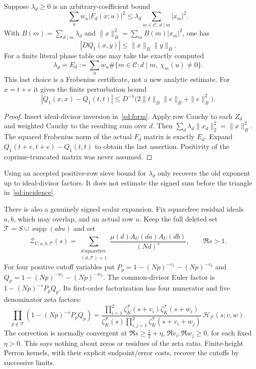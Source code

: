 \begin{proposition}\label{sd:lift}
Suppose $\lambda_d\ge0$ is an arbitrary-coefficient bound
\[
 \sum_u w_u|F_d(x;u)|^2\le\lambda_d
                 \sum_{m\in\mathcal C,\ d\mid m}|x_m|^2.
\]
With $B(m)=\sum_{d\mid m}\lambda_d$ and
$\|x\|_B^2=\sum_mB(m)|x_m|^2$, one has
\begin{equation}\label{sd:weighted}
 |DQ_1(x,y)|\le\|x\|_B\|y\|_B.
\end{equation}
For a finite literal phase table one may take the exactly computed
\[
 \lambda_d=E_d:=\sum_u w_u\#\{m\in\mathcal C:d\mid m,\ \chi_m(u)\ne0\}.
\]
This last choice is a Frobenius certificate, not a new analytic estimate.
For $x=t+e$ it gives the finite perturbation bound
\begin{equation}\label{sd:certificate}
 |Q_1(x,x)-Q_1(t,t)|\le
 D^{-1}\bigl(2\|t\|_B\|e\|_B+\|e\|_B^2\bigr).
\end{equation}
\end{proposition}
\begin{proof}
Insert ideal-divisor inversion in~\eqref{sd:form}. Apply row Cauchy to
each $Z_d$ and weighted Cauchy to the resulting sum over $d$.
Then $\sum_d\lambda_d\|x_d\|_2^2=\|x\|_B^2$.
The squared Frobenius norm of the actual $F_d$ matrix is exactly $E_d$.
Expand $Q_1(t+e,t+e)-Q_1(t,t)$ to obtain the last assertion.
Positivity of the coprime-truncated matrix was never assumed.
\end{proof}
Using an accepted positive-row sieve bound for $\lambda_d$ only recovers
the old exponent up to ideal-divisor factors. It does not estimate the
signed sum before the triangle in~\eqref{sd:incidence}.

There is also a genuinely signed scalar expansion. Fix squarefree residual
ideals $a,b$, which may overlap, and an actual row $u$.
Keep the full deleted set $\mathcal T=S\cup\operatorname{supp}(abu)$ and set
\[
 \mathcal Z_{U;a,b,\mathcal T}(s)=
 \sum_{\substack{d\ \mathrm{squarefree}\\(d,\mathcal T)=1}}
 \frac{\mu(d)A_U(da)A_U(db)}{(Nd)^s},\qquad\Re s>1.
\]
For four positive cutoff variables put
$P_p=1-(Np)^{-v_1}-(Np)^{-v_2}$ and
$Q_p=1-(Np)^{-w_1}-(Np)^{-w_2}$.
The common-divisor Euler factor is $1-(Np)^{-s}P_pQ_p$.
Its first-order factorization has four numerator and five denominator
zeta factors:
\begin{equation}\label{sd:nine}
 \prod_{p\notin\mathcal T}(1-(Np)^{-s}P_pQ_p)
 =\frac{\prod_{i=1}^2\zeta_K^{\mathcal T}(s+v_i)
                         \zeta_K^{\mathcal T}(s+w_i)}
 {\zeta_K^{\mathcal T}(s)
       \prod_{i,j=1}^2\zeta_K^{\mathcal T}(s+v_i+w_j)}\,
       \mathcal H_{\mathcal T}(s;v,w).
\end{equation}
The correction is normally convergent at
$\Re s\ge\tfrac12+\eta$, $\Re v_i,\Re w_j\ge0$, for each fixed
$\eta>0$. This says nothing about zeros or residues of the zeta ratio.
Finite-height Perron kernels, with their explicit endpoint/error costs,
recover the cutoffs by successive limits.

